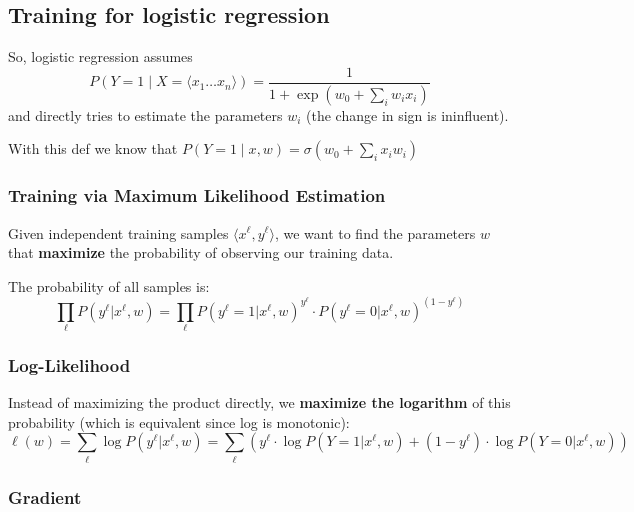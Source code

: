\subsection{Training for logistic regression}
So, logistic regression assumes
\[
 P(Y=1\mid X =\langle x_1 \dots x_n\rangle) =\frac{1}{1+\exp{(w_0+\sum_iw_ix_i)}}
\]
and directly tries to estimate the parameters $w_i$ (the change in sign
is ininfluent).


With this def we know that $P(Y=1\mid x, w) = \sigma (w_0 + \sum_{i}x_iw_i)$

\subsubsection{Training via Maximum Likelihood Estimation}

Given independent training samples $\langle x^\ell, y^\ell \rangle$, we want to find the parameters $w$ that \textbf{maximize} the probability of observing our training data.

The probability of all samples is:
\[
\prod_\ell P(y^\ell | x^\ell, w) = \prod_\ell P(y^\ell = 1|x^\ell, w)^{y^\ell} \cdot P(y^\ell = 0|x^\ell, w)^{(1-y^\ell)}
\]


\subsubsection{Log-Likelihood}

Instead of maximizing the product directly, we \textbf{maximize the logarithm} of this probability (which is equivalent since log is monotonic):
\[
\ell(w) = \sum_\ell \log P(y^\ell | x^\ell, w) = \sum_\ell \left( y^\ell \cdot \log P(Y=1|x^\ell, w) + (1-y^\ell) \cdot \log P(Y=0|x^\ell, w) \right)
\]

\subsubsection{Gradient}


